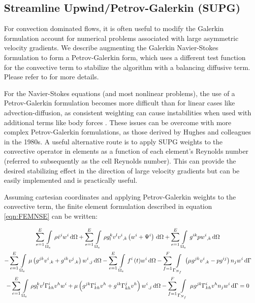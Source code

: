 \subsection{Streamline Upwind/Petrov-Galerkin (SUPG)}

For convection dominated flows, it is often useful to modify the Galerkin
formulation account for numerical problems associated with large asymmetric
velocity gradients. We describe augmenting the Galerkin Navier-Stokes
formulation to form a Petrov-Galerkin form, which uses a different test
function for the convective term to stabilize the algorithm with a balancing
diffusive term. Please refer to  for
more details.

For the Navier-Stokes equations (and most nonlinear problems), the use of a
Petrov-Galerkin formulation becomes more difficult than for linear cases like
advection-diffusion, as consistent weighting can cause instabilities when used
with additional terms like body forces \cite{heinrich:1999}. These issues can
be overcome with more complex Petrov-Galerkin formulations, as those derived
by Hughes and colleagues in the 1980s. A useful alternative route is to apply
SUPG weights to the convective operator in elements as a function of each
element's Reynolds number (referred to subsequently as the cell Reynolds
number). This can provide the desired stabilizing effect in the direction of
large velocity gradients but can be easily implemented and is practically
useful.

Assuming cartesian coordinates and applying Petrov-Galerkin weights to the
convective term, the finite element formulation described in equation
\ref{eqn:FEMNSE} can be written:

\begin{multline}
  \gsum{e=1}{E}{\gint{\Omega_{e}}{}{\rho\dot{v}^{i}w^{i}}{\Omega}}
 +\gsum{e=1}{E}{\gint{\Omega_{e}}{}{{\rho}g^{k}_{l}{v^{l}}\partialderiv{v^{i}}{k}\pbrac{w^{i}+\Psi^{i}}}{\Omega}}
 +\gsum{e=1}{E}{\gint{\Omega_{e}}{}{g^{ik}{p}\partialderiv{w^{i}}{k}}{\Omega}}\\
 -\gsum{e=1}{E}{\gint{\Omega_{e}}{}{\mu\pbrac{g^{jk}\partialderiv{v^{i}}{k}+g^{ik}\partialderiv{v^{j}}{k}}\partialderiv{w^{i}}{j}}{\Omega}}
 -\gsum{e=1}{E}{\gint{\Omega_{e}}{}{{\fnof{f^{i}}{t}}{w^{i}}}{\Omega}}
 -\gsum{f=1}{F}{\gint{\Gamma_{N_{f}}}{}{\pbrac{\mu g^{jk}\partialderiv{v^{i}}{k}-pg^{ij}}n_{j}w^{i}}{\Gamma}}\\
 -\gsum{e=1}{E}{\gint{\Omega_{e}}{}{\rho
   g^{k}_{l}v^{l}\christoffel{i}{k}{h}v^{h}w^{i}+\mu\pbrac{g^{jk}\christoffel{i}{k}{h}v^{h}+
     g^{ik}\christoffel{j}{k}{h}v^{h}}\partialderiv{w^{i}}{j}}{\Omega}}
 -\gsum{f=1}{F}{\gint{\Gamma_{N_{f}}}{}{\mu g^{jk}\christoffel{i}{k}{h}v^{h}n_{j}w^{i}}{\Gamma}}=0
  \label{eqn:NSEPGFEM1}
\end{multline}

